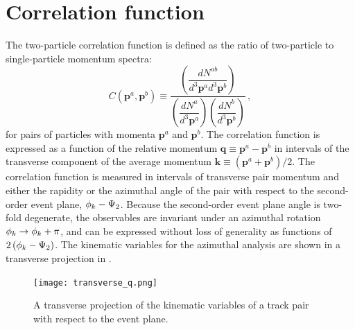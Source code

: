 \section{Correlation function}
\label{sec:corr_func}
The two-particle correlation function is defined as the ratio of two-particle to single-particle momentum spectra:
\begin{equation} \label{eq:corr_deff}
  C\left(\mathbf{p}^a, \mathbf{p}^b\right) \equiv \dfrac{\left(\dfrac{dN^{ab}}{d^3\mathbf{p}^a d^3\mathbf{p}^b}\right)}{\left(\dfrac{dN^{a}}{d^3\mathbf{p}^a}\right)\left(\dfrac{dN^{b}}{d^3\mathbf{p}^b}\right)} \,,
\end{equation}
for pairs of particles with momenta $\mathbf{p}^a$ and $\mathbf{p}^b$.
The correlation function is expressed as a function of the relative momentum $\mathbf{q} \equiv \mathbf{p}^a - \mathbf{p}^b$ in intervals of the transverse component \kt of the average momentum $\mathbf{k} \equiv \left(\mathbf{p}^a + \mathbf{p}^b\right)/2$.
The correlation function is measured in intervals of transverse pair momentum \kt and either the rapidity \kys or the azimuthal angle of the pair with respect to the second-order event plane, $\phi_{k}-\Psi_{2}$.
Because the second-order event plane angle is two-fold degenerate, the observables are invariant under an azimuthal rotation $\phi_{k} \rightarrow \phi_{k} + \pi$, and can be expressed without loss of generality as functions of $2\left(\phi_{k}-\Psi_{2}\right)$. %
The kinematic variables for the azimuthal analysis are shown in a transverse projection in \Fig{\ref{fig:transverse_q}}.

\begin{figure}[t]
  \centering
  \texttt{[image: transverse\_q.png]}
  \caption{A transverse projection of the kinematic variables of a track pair with respect to the event plane.}
\label{fig:transverse_q}
\end{figure}

